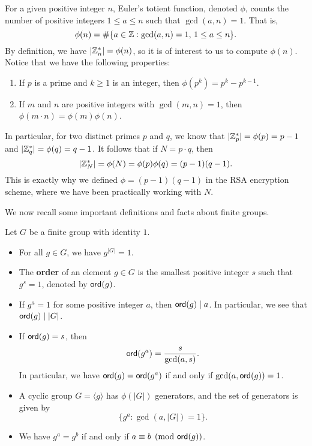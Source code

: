 For a given positive integer $n$, Euler's totient function, denoted $\phi$, counts the number of positive
integers $1 \leq a \leq n$ such that $\gcd(a, n) = 1$. That is, 
\[ \phi(n) = \#\{a \in \mathbb{Z} : \gcd(a, n) = 1,\, 1 \leq a \leq n\}. \]
By definition, we have $|\mathbb{Z}_n^*| = \phi(n)$, so it is of interest to us to compute $\phi(n)$. 
Notice that we have the following properties:
\begin{enumerate}[(1)]
    \item If $p$ is a prime and $k \geq 1$ is an integer, then $\phi(p^k) = p^k - p^{k-1}$. 
    \item If $m$ and $n$ are positive integers with $\gcd(m, n) = 1$, then 
    $\phi(m \cdot n) = \phi(m) \phi(n)$. 
\end{enumerate}
In particular, for two distinct primes $p$ and $q$, we know that $|\mathbb{Z}_p^*| = \phi(p) = p-1$ 
and $|\mathbb{Z}_q^*| = \phi(q) = q-1$. It follows that if $N = p \cdot q$, then 
\[ |\mathbb{Z}_N^*| = \phi(N) = \phi(p)\phi(q) = (p-1)(q-1). \]
This is exactly why we defined $\phi = (p-1)(q-1)$ in the RSA encryption scheme, where we have been 
practically working with $N$. 

We now recall some important definitions and facts about finite groups. 

\begin{prop}
Let $G$ be a finite group with identity $1$. 
\begin{itemize}
    \item For all $g \in G$, we have $g^{|G|} = 1$. 
    \item The {\bf order} of an element $g \in G$ is the smallest positive integer $s$ such that 
    $g^s = 1$, denoted by ${\sf ord}(g)$. 
    \item If $g^a = 1$ for some positive integer $a$, then ${\sf ord}(g) \mid a$. In particular, we see that 
    ${\sf ord}(g) \mid |G|$. 
    \item If ${\sf ord}(g) = s$, then 
    \[ {\sf ord}(g^a) = \frac{s}{\gcd(a, s)}. \]
    In particular, we have ${\sf ord}(g) = {\sf ord}(g^a)$ if and only if $\gcd(a, {\sf ord}(g)) = 1$. 
    \item A cyclic group $G = \langle g \rangle$ has $\phi(|G|)$ generators, and the set of 
    generators is given by 
    \[ \{g^a : \gcd(a, |G|) = 1\}. \]
    \item We have $g^a = g^b$ if and only if $a \equiv b \pmod{{\sf ord}(g)}$. 
\end{itemize}
\end{prop}

